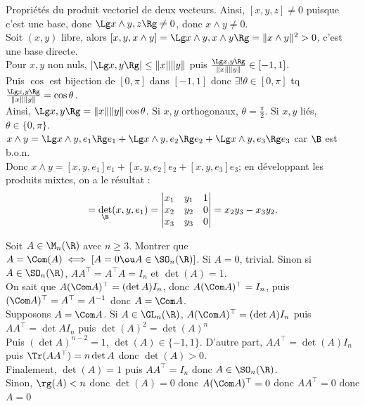 \documentclass[11pt]{article}
\begin{document}
\begin{prop}{Propriétés du produit vectoriel de deux vecteurs.}{}
    Ainsi, $[x,y,z]\neq0$ puisque c'est une base, donc $\Lg x\land y, z \Rg \neq 0$, donc $x\land y \neq 0$.\\
     Soit $(x,y)$ libre, alors $[x,y,x\land y]=\Lg x\land y, x\land y\Rg = \|x\land y\|^2>0$, c'est une base directe.\\
     Pour $x,y$ non nuls, $|\Lg x,y\Rg|\leq\|x\|\|y\|$ puis $\frac{\Lg x,y\Rg}{\|x\|\|y\|}\in[-1,1]$.\\
    Puis $\cos$ est bijection de $[0,\pi]$ dans $[-1,1]$ donc $\exists!\theta\in[0,\pi]$ tq $\frac{\Lg x,y\Rg}{\|x\|\|y\|}=\cos\theta$.\\
    Ainsi, $\Lg x,y\Rg = \|x\|\|y\|\cos\theta$. Si $x,y$ orthogonaux, $\theta=\frac{\pi}{2}$. Si $x,y$ liés, $\theta\in\{0,\pi\}$.\\
     $x\land y = \Lg x \land y , e_1\Rg e_1 + \Lg x\land y , e_2\Rg e_2 + \Lg x \land y, e_3\Rg e_3$ car $\B$ est b.o.n.\\
    Donc $x\land y = [x,y,e_1]e_1 + [x,y,e_2]e_2+[x,y,e_3]e_3$; en développant les produits mixtes, on a le résultat :
    \begin{equation*}
        [x,y,e_1] = \det_\B(x,y,e_1) = \begin{vmatrix}x_1 & y_1 & 1 \\ x_2 & y_2 & 0 \\ x_3 & y_3 & 0\end{vmatrix}=x_2y_3-x_3y_2.
    \end{equation*}
\end{prop}

\vspace*{-0.7cm}

\begin{exercice}{}{}
    Soit $A\in\M_n(\R)$ avec $n\geq3$. Montrer que $A=\Com(A)\iff \left[ A = 0 \ou A \in \SO_n(\R) \right]$.
    \tcblower
    \boxed{\la} Si $A=0$, trivial. Sinon si $A\in\SO_n(\R)$, $AA^\top=A^\top A=I_n$ et $\det(A)=1$.\\
    On sait que $A(\Com A)^\top = (\det A)I_n$, donc $A(\Com A)^\top = I_n$, puis $(\Com A)^\top = A^\top = A^{-1}$ donc $A=\Com A$.\\
    \boxed{\ra} Supposons $A=\Com A$. Si $A\in\GL_n(\R)$, $A(\Com A)^\top = (\det A)I_n$ puis $AA^\top = \det A I_n$ puis $\det(A)^2=\det(A)^n$\\
    Puis $(\det A)^{n-2}=1$, $\det(A)\in\{-1,1\}$. D'autre part, $AA^\top=\det(A)I_n$ puis $\Tr(AA^\top)=n\det A$ donc $\det(A)>0$.\\
    Finalement, $\det(A)=1$ puis $AA^\top = I_n$ donc $A\in\SO_n(\R)$.\\
    Sinon, $\rg(A)<n$ donc $\det(A)=0$ donc $A(\Com A)^\top = 0$ donc $AA^\top = 0$ donc $A=0$
\end{exercice}
\end{document}
